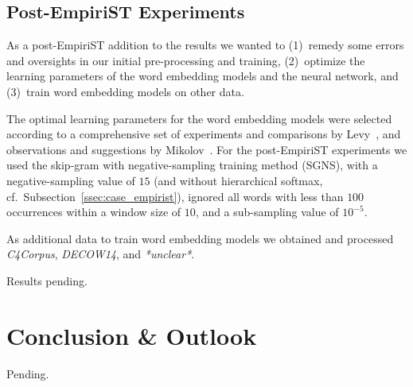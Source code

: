 \documentclass[11pt]{article}
\begin{document}
\subsection{Post-EmpiriST Experiments}
\label{ssec:case_postempirist}
As a post-EmpiriST addition to the results we wanted to (1)~remedy some errors and oversights in our initial pre-processing and training, (2)~optimize the learning parameters of the word embedding models and the neural network, and (3)~train word embedding models on other data.

The optimal learning parameters for the word embedding models were selected according to a comprehensive set of experiments and comparisons by Levy~, and observations and suggestions by Mikolov~. For the post-EmpiriST experiments we used the skip-gram with negative-sampling training method (SGNS), with a negative-sampling value of $15$ (and without hierarchical softmax, cf.~Subsection~\ref{ssec:case_empirist}), ignored all words with less than $100$ occurrences within a window size of $10$, and a sub-sampling value of $10^{-5}$. 

As additional data to train word embedding models we obtained and processed \emph{C4Corpus}, \emph{DECOW14}, and \emph{*unclear*}.

\fxnote[inline]{}Results pending.


\section{Conclusion \& Outlook}
\label{sec:conclusion}

\fxnote[inline]{}Pending.


\clearpage
%
%



\end{document}
